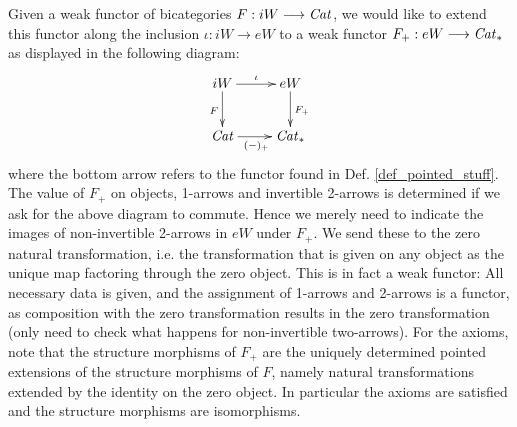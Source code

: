   \begin{defn}\label{def_extending_functor_iW_to_Cat_to_pointed_version}
    Given a weak functor of bicategories $F: iW \longrightarrow \mathit{Cat}$, we would like to extend this functor along the inclusion $\iota: iW \to eW$ to a weak functor $F_+: eW \longrightarrow \mathit{Cat}_*$ as displayed in the following diagram:
    \begin{displaymath}
      \xymatrix{
        iW
          \ar[d]_{F}
          \ar[r]^{\iota}
        &
        eW
          \ar[d]^{F_+}
        \\
        \Cat
          \ar[r]_{(-)_+}
        &
        \Cat_*
      }
    \end{displaymath}
    where the bottom arrow refers to the functor found in Def. \ref{def_pointed_stuff}. The value of $F_+$ on objects, 1-arrows and invertible 2-arrows is determined if we ask for the above diagram to commute. Hence we merely need to indicate the images of non-invertible 2-arrows in $eW$ under $F_+$. We send these to the zero natural transformation, i.e. the transformation that is given on any object as the unique map factoring through the zero object. This is in fact a weak functor: All necessary data is given, and the assignment of 1-arrows and 2-arrows is a functor, as composition with the zero transformation results in the zero transformation (only need to check what happens for non-invertible two-arrows). For the axioms, note that the structure morphisms of $F_+$ are the uniquely determined pointed extensions of the structure morphisms of $F$, namely natural transformations extended by the identity on the zero object. In particular the axioms are satisfied and the structure morphisms are isomorphisms.
  \end{defn}


